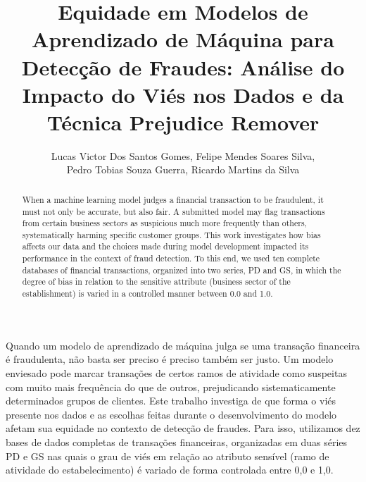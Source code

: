 \documentclass[12pt]{article}
\title{Equidade em Modelos de Aprendizado de Máquina para Detecção de Fraudes: Análise do Impacto do Viés nos Dados e da Técnica Prejudice Remover}
\author{Lucas Victor Dos Santos Gomes\inst{1}, Felipe Mendes Soares Silva\inst{1},\\ Pedro Tobias Souza Guerra\inst{1}, Ricardo Martins da Silva\inst{1}}
\begin{document}
 

\maketitle

\begin{abstract}
    When a machine learning model judges a financial transaction to be fraudulent, it must not only be accurate, but also fair. A submitted model may flag transactions from certain business sectors as suspicious much more frequently than others, systematically harming specific customer groups. This work investigates how bias affects our data and the choices made during model development impacted its performance in the context of fraud detection. To this end, we used ten complete databases of financial transactions, organized into two series, PD and GS, in which the degree of bias in relation to the sensitive attribute (business sector of the establishment) is varied in a controlled manner between 0.0 and 1.0.
\end{abstract}

\begin{resumo}
    Quando um modelo de aprendizado de máquina julga se uma transação financeira é fraudulenta, não basta ser preciso é preciso também ser justo. Um modelo enviesado pode marcar transações de certos ramos de atividade como suspeitas com muito mais frequência do que de outros, prejudicando sistematicamente determinados grupos de clientes. Este trabalho investiga de que forma o viés presente nos dados e as escolhas feitas durante o desenvolvimento do modelo afetam sua equidade no contexto de detecção de fraudes. Para isso, utilizamos dez bases de dados completas de transações financeiras, organizadas em duas séries PD e GS nas quais o grau de viés em relação ao atributo sensível (ramo de atividade do estabelecimento) é variado de forma controlada entre 0,0 e 1,0.
    
    
\end{resumo}









% 



 
\end{document}
